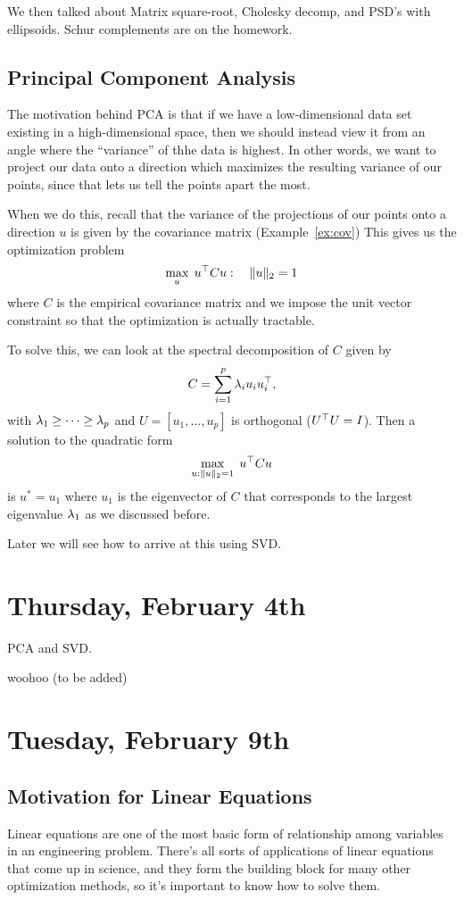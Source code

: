 \documentclass[11 pt]{scrartcl}
\begin{document}
We then talked about Matrix square-root, Cholesky decomp, and PSD's with ellipsoids. 
Schur complements are on the homework.

\subsection{Principal Component Analysis}

The motivation behind PCA is that if we have a low-dimensional data set existing in a high-dimensional space, then we should instead view it from an angle where the ``variance'' of thhe data is highest. 
In other words, we want to project our data onto a direction which maximizes the resulting variance of our points, since that lets us tell the points apart the most. 

When we do this, recall that the variance of the projections of our points onto a direction $u$ is given by the covariance matrix (Example~\ref{ex:cov})
This gives us the optimization problem 
\[ \max_u\; u^\top C u: \quad \|u\|_2 = 1\] 
where $C$ is the empirical covariance matrix and we impose the unit vector constraint so that the optimization is actually tractable. 

To solve this, we can look at the spectral decomposition of $C$ given by 
\[ C = \sum_{i=1}^p \lambda_i u_i u_i^\top,\] 
with $\lambda_1 \geq \dots \geq \lambda_p$ and $U = [u_1,\dots, u_p]$ is orthogonal ($U^\top U = I$). Then a solution to the quadratic form 
\[ \max_{u: \|u\|_2=1} \; u^\top C u\] 
is $u^* = u_1$ where $u_1$ is the eigenvector of $C$ that corresponds to the largest eigenvalue $\lambda_1$ as we discussed before. 

Later we will see how to arrive at this using SVD. 


\newpage
\section{Thursday, February 4th}
PCA and SVD. 

\begin{theorem}[SVD]
    woohoo (to be added)
    \label{thm:svd}
\end{theorem}


\newpage
\section{Tuesday, February 9th}
\subsection{Motivation for Linear Equations}
Linear equations are one of the most basic form of relationship among variables in an engineering problem. 
There's all sorts of applications of linear equations that come up in science, and they form the building block for many other optimization methods, so it's important to know how to solve them.
\end{document}
